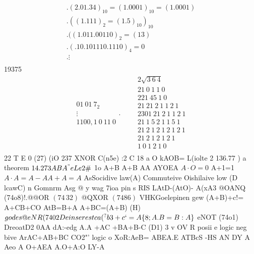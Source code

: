 \documentclass[12pt, a4paper]{article}
\begin{document}
$$
\begin{array} {c} {
	{
		. ( 2. 0 1. 3 4 )_{1 0}=( 1. 0 0 0 1 )_{1 0}=( 1. 0 0 0 1 )}} \\ {{. ( ( 1. 1 1 1 )_{2}=( 1. 5 )_{1 0} )_{1 0}}} \\ {{. ( ( 1. 0 1 1. 0 0 1 1 0 )_{2}=( 1 3 )}} \\ {{. ( . 1 0. 1 0 1 1 1 0. 1 1 1 0 )_{4}=0}} \\ {{. \vdots}} \\ \end{array}
$$
19375
$$
\begin{array} {c} {{0 1 ~ 0 1 ~ 7_{2} ~}} \\ {{\vdots}} \\ {{1 1 0 0, 1 ~ 0 ~ 1 1 ~ 0}} \end{array} \biggr. \qquad\begin{array} {c} {{2 \sqrt{3 ~ 6 ~ 4}}} \\ {{2 1 ~ 0 ~ 1 ~ 1 ~ 0}} \\ {{2 2 1 ~ 4 5 ~ 1 ~ 0}} \\ {{2 1 ~ 2 1 ~ 2 ~ 1 ~ 1 ~ 2 ~ 1}} \\ {{2 3 0 1 ~ 2 1 ~ 2 ~ 1 ~ 1 ~ 2 ~ 1}} \\ {{2 1 ~ 1 ~ 5 ~ 2 ~ 1 ~ 1 ~ 5 ~ 1}} \\ {{2 1 ~ 2 ~ 1 ~ 2 ~ 1 ~ 2 ~ 1 ~ 2 ~ 1}} \\ {{2 1 ~ 2 ~ 1 ~ 2 ~ 1 ~ 2 ~ 1}} \\ {{1 ~ 0 ~ 1 ~ 2 ~ 1 ~ 0}} \\ \end{array}
$$
22 T E 0
(27) (iO 237 XNOR C(n5e)
:2
C 18
a O kAOB=
L(iolte 2
136.77
) a
theorem
$14.273 AB A ^"e Le2 \#$
1o A+B A+B AA AYOEA
 $A \cdot O=0$ A+1=1
 $A \cdot A=A-A A+A=A$ 
AsSocidive law(A) Commuteive Oishilaive low (D
lcawC)
n Gomnrm Asg @ y wag 7ioa pin s RIS  LAtD-(AtO)- A(xA3
@OANQ (74o8)!.@@OR $( 7 4 \, 3 2 )$ @QXOR $( 7 4 8 6 )$ VHKGoelepinen gew (A+B)+c!= A+CB+CO AtB=B+A A+BC=(A+B) (H)
$godes @eNR(7402D ein serestca (^?b3+c`= A\{8; A.B=B:A\}$
eNOT (74o1) DreoatD2 0AA
dA:-edg A.A +AC +BA+B-C (D1)
3 v OV
R
posii e logic neg bive ArAC+AB+BC CO2"'
logic o
XoR:AeB= ABEA.E ATBcS
-HS
AN
DY A Aeo A O+AEA
A.O+A:O
LY-A
\end{document}
